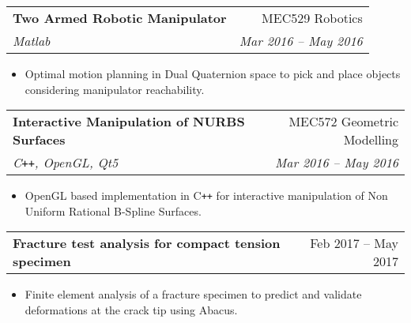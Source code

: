 \documentclass[letterpaper,10pt]{article}
\makeatletter
\newcommand{\resumeHeading}[4]{
  \vspace{-1pt}
    \begin{tabular*}{0.97\textwidth}{l@{\extracolsep{\fill}}r}
      \textbf{#1} & #2 \vspace{-2pt}\\ \vspace{1pt}
      \textit{\small#3} & \textit{\small #4} \\
    \end{tabular*}
}
\newcommand{\resumeHeadingwithDate}[2]{
	\vspace{-1pt}
	\begin{tabular*}{0.97\textwidth}{l@{\extracolsep{\fill}}r}
		\textbf{#1} & #2 \vspace{-2pt}\\
	\end{tabular*}
	\vspace{+2pt}
}
\newcommand{\resumeItemListStart}{
\vspace{-7pt}
\begin{itemize}[leftmargin=14pt]
}
\newcommand{\resumeItemListEnd}{
\vspace{+7pt}
\end{itemize}
}
\newcommand{\resumeItem}[1]{
  \item\small{
      {#1 \vspace{-7pt}
      }
  }
}
\makeatother
\begin{document}
	
	
	
	\vspace{-2pt}
	\resumeHeading{Two Armed Robotic Manipulator}{MEC529 Robotics}{Matlab}{Mar 2016 -- May 2016}
	\resumeItemListStart
	\resumeItem{Optimal motion planning in Dual Quaternion space to pick and place objects considering manipulator reachability.}
	\resumeItemListEnd
	
	\vspace{-2pt}
	\resumeHeading{Interactive Manipulation of NURBS Surfaces}{MEC572 Geometric Modelling}{C\texttt{++}, OpenGL, Qt5}{Mar 2016 -- May 2016}
	\resumeItemListStart
	\resumeItem{OpenGL based implementation in C\texttt{++} for interactive manipulation of Non Uniform Rational B-Spline Surfaces.}
	\resumeItemListEnd
	
	\resumeHeadingwithDate{Fracture test analysis for compact tension specimen}{Feb 2017 -- May 2017}
	\resumeItemListStart
	\resumeItem{Finite element analysis of a fracture specimen to predict and validate deformations at the crack tip using Abacus.}
	\resumeItemListEnd
	
\end{document}
